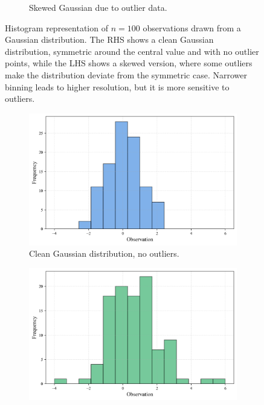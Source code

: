 \documentclass{book}
\begin{document}
\begin{figure}[ht]
\begin{subfigure}[b]{0.48\textwidth}
        \caption{Skewed Gaussian due to outlier data.}
        \label{fig:histogram2_bins_small}
    \end{subfigure}
    \caption{Histogram representation of $n = 100$ observations drawn from a Gaussian distribution. The RHS shows a clean Gaussian distribution, symmetric around the central value and with no outlier points, while the LHS shows a skewed version, where some outliers make the distribution deviate from the symmetric case. Narrower binning leads to higher resolution, but it is more sensitive to outliers.}
    \label{fig:histogram_comparison2}
\end{figure}

\begin{figure}[ht]
    \centering
    \begin{subfigure}[b]{0.48\textwidth}
        \centering
        \includegraphics[width=\textwidth, height=0.7\textwidth]{figures/chapter1/histogram1_bins_large.png}
        \caption{Clean Gaussian distribution, no outliers.}
        \label{fig:histogram1_bins_large}
    \end{subfigure}
    \hfill
    \begin{subfigure}[b]{0.48\textwidth}
        \centering
        \includegraphics[width=\textwidth, height=0.7\textwidth]{figures/chapter1/histogram2_bins_large.png}

\end{subfigure}
\end{figure}
\end{document}
